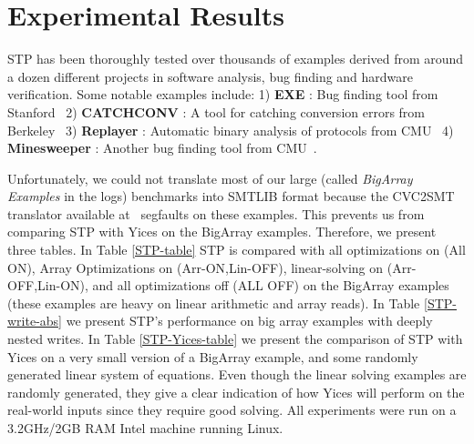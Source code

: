 \section{Experimental Results}

STP has been thoroughly tested over thousands of examples derived from
around a dozen different projects in software analysis, bug finding
and hardware verification. Some notable examples include: 1) {\bf EXE}
: Bug finding tool from Stanford~\cite{exe-ccs06} 2) {\bf CATCHCONV} :
A tool for catching conversion errors from Berkeley~\cite{catchconv07}
3) {\bf Replayer} : Automatic binary analysis of protocols from
CMU~\cite{replayer06} 4) {\bf Minesweeper} : Another bug finding tool
from CMU~\cite{minesweeper2007}.

Unfortunately, we could not translate most of our large (called {\it
BigArray Examples} in the logs) benchmarks into SMTLIB format because
the CVC2SMT translator available at~\cite{smtlib} segfaults on these
examples. This prevents us from comparing STP with Yices on the
BigArray examples. Therefore, we present three tables. In Table
\ref{STP-table} STP is compared with all optimizations on (All ON),
Array Optimizations on (Arr-ON,Lin-OFF), linear-solving on
(Arr-OFF,Lin-ON), and all optimizations off (ALL OFF) on the BigArray
examples (these examples are heavy on linear arithmetic and array
reads). In Table \ref{STP-write-abs} we present STP's performance on
big array examples with deeply nested writes. In Table
\ref{STP-Yices-table} we present the comparison of STP with Yices on a
very small version of a BigArray example, and some randomly generated
linear system of equations. Even though the linear solving examples
are randomly generated, they give a clear indication of how Yices will
perform on the real-world inputs since they require good solving. All
experiments were run on a 3.2GHz/2GB RAM Intel machine running Linux.

